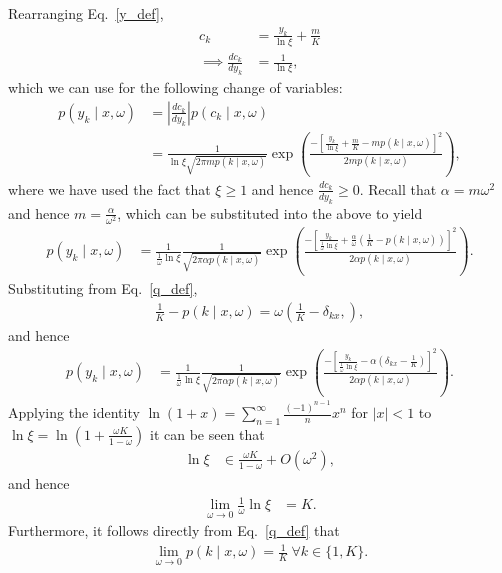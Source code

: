 \documentclass[11pt,table]{article}
\newcommand{\0}[1]{\constvec{0}{#1}}
\newcommand{\1}[1]{\constvec{1}{#1}}
\newcommand{\ds}[1]{\{1,#1\}}
\begin{document}
Rearranging Eq.~\ref{y_def},
\begin{align}
c_k &= \frac{y_k}{\ln\xi} + \frac{m}{K}\\
\implies \frac{d c_k}{d y_k} &= \frac{1}{\ln\xi},
\end{align}
which we can use for the following change of variables:
\begin{align}
p(y_k \mid x,\omega) &= \left|\frac{d c_k}{d y_k} \right|p(c_k \mid x, \omega)\\
&= \frac{1}{\ln\xi\sqrt{2\pi m p(k \mid x,\omega)}}\exp\left(\frac{-\left[\frac{y_k}{\ln\xi} + \frac{m}{K} - m p(k \mid x,\omega)\right]^2}{2 m p(k \mid x,\omega)}\right)\label{above},
\end{align}
where we have used the fact that $\xi \geq 1$ and hence $\frac{d c_k}{d y_k} \geq 0$. 
Recall that $\alpha = m\omega^2$ and hence $m = \frac{\alpha}{\omega^2}$,
 which can be substituted into the above to yield
\begin{align}
p(y_k \mid x,\omega) &= \frac{1}{\frac{1}{\omega}\ln\xi}\frac{1}{\sqrt{2\pi \alpha p(k \mid x,\omega)}}\exp\left(\frac{-\left[\frac{y_k}{\frac{1}{\omega}\ln \xi} + \frac{\alpha}{\omega}\left(\frac{1}{K}-p(k \mid x,\omega)\right)\right]^2}{2\alpha p(k \mid x,\omega)}\right).
\end{align}
Substituting from Eq.~\ref{q_def},
\begin{align}
\frac{1}{K}-p(k \mid x,\omega) = \omega\left(\frac{1}{K}-\delta_{kx},\right),
\end{align}
and hence
\begin{align}
p(y_k \mid x,\omega) &= \frac{1}{\frac{1}{\omega}\ln\xi}\frac{1}{\sqrt{2\pi \alpha p(k \mid x,\omega)}}\exp\left(\frac{-\left[\frac{y_k}{\frac{1}{\omega}\ln \xi} - \alpha\left(\delta_{k x} - \frac{1}{K}\right)\right]^2}{2\alpha p(k \mid x,\omega)}\right)\label{p_y_i_omega}.
\end{align}
Applying the identity $\ln(1+x) = \sum_{n=1}^{\infty} \frac{(-1)^{n-1}}{n}x^n$ for $|x| < 1$  to $\ln \xi = \ln\left(1 + \frac{\omega K}{1-\omega} \right)$ it can be seen that
\begin{align}
\ln \xi &\in  \frac{\omega K}{1-\omega} + O(\omega^2),
\end{align}
and hence
\begin{align}
\lim_{\omega \rightarrow 0} \frac{1}{\omega}\ln \xi &= K.\label{gamma_limit}
\end{align}
Furthermore, it follows directly from Eq.~\ref{q_def} that
\begin{align}
\lim_{\omega \rightarrow 0} p(k \mid x,\omega) = \frac{1}{K}\ \forall k \in \ds{K}\label{q_limit}.
\end{align}
\end{document}
